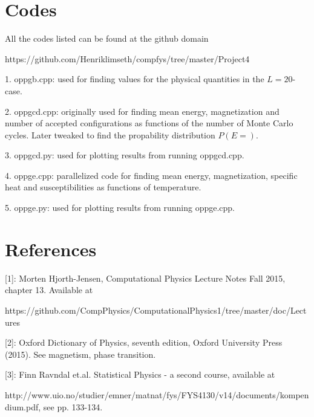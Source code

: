 \documentclass[english, 12pt]{article}
\begin{document}
\section{Codes}
All the codes listed can be found at the github domain

https://github.com/Henriklimseth/compfys/tree/master/Project4

1. oppgb.cpp: used for finding values for the physical quantities in the $L=20$-case.

2. oppgcd.cpp: originally used for finding mean energy, magnetization and number of accepted configurations as functions of the number of Monte Carlo cycles. Later tweaked to find the propability distribution $P(E=)$.

3. oppgcd.py: used for plotting results from running oppgcd.cpp.

4. oppge.cpp: parallelized code for finding mean energy, magnetization, specific heat and susceptibilities as functions of temperature.

5. oppge.py: used for plotting results from running oppge.cpp.



\section{References}
[1]: Morten Hjorth-Jensen, Computational Physics Lecture Notes Fall 2015, chapter 13. Available at

https://github.com/CompPhysics/ComputationalPhysics1/tree/master/doc/Lectures

[2]: Oxford Dictionary of Physics, seventh edition, Oxford University Press (2015). See magnetism, phase transition. 

[3]: Finn Ravndal et.al. Statistical Physics - a second course, available at

http://www.uio.no/studier/emner/matnat/fys/FYS4130/v14/documents/kompendium.pdf, see pp. 133-134.
\end{document}
